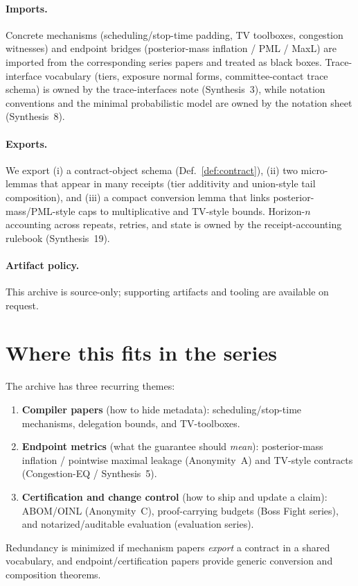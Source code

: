 \documentclass[11pt]{article}
\begin{document}
\paragraph{Imports.}
Concrete mechanisms (scheduling/stop-time padding, TV toolboxes, congestion witnesses) and endpoint bridges (posterior-mass inflation / PML / MaxL) are imported from the corresponding series papers and treated as black boxes.
Trace-interface vocabulary (tiers, exposure normal forms, committee-contact trace schema) is owned by the trace-interfaces note (Synthesis~3), while notation conventions and the minimal probabilistic model are owned by the notation sheet (Synthesis~8).\cite{series:traceifaces,series:notation}

\paragraph{Exports.}
We export (i) a contract-object schema (Def.~\ref{def:contract}), (ii) two micro-lemmas that appear in many receipts (tier additivity and union-style tail composition), and (iii) a compact conversion lemma that links posterior-mass/PML-style caps to multiplicative and TV-style bounds. Horizon-$n$ accounting across repeats, retries, and state is owned by the receipt-accounting rulebook (Synthesis~19).\cite{series:accountingrulebook}

\paragraph{Artifact policy.}
This archive is source-only; supporting artifacts and tooling are available on request.\cite{series:artifactpolicy}


\section{Where this fits in the series}
The archive has three recurring themes:
\begin{enumerate}[leftmargin=*]
\item \textbf{Compiler papers} (how to hide metadata): scheduling/stop-time mechanisms, delegation bounds, and TV-toolboxes.
\item \textbf{Endpoint metrics} (what the guarantee should \emph{mean}): posterior-mass inflation / pointwise maximal leakage (Anonymity~A) and TV-style contracts (Congestion-EQ / Synthesis~5).
\item \textbf{Certification and change control} (how to ship and update a claim): ABOM/OINL (Anonymity~C), proof-carrying budgets (Boss Fight series), and notarized/auditable evaluation (evaluation series).
\end{enumerate}
Redundancy is minimized if mechanism papers \emph{export} a contract in a shared vocabulary, and endpoint/certification papers
provide generic conversion and composition theorems.
\end{document}
